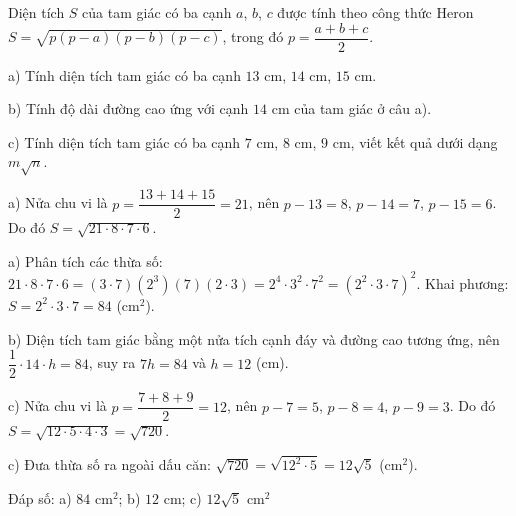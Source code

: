 \begin{problem}[9DS-CAN-042]
Diện tích $S$ của tam giác có ba cạnh $a$, $b$, $c$ được tính theo công thức Heron $S = \sqrt{p(p - a)(p - b)(p - c)}$, trong đó $p = \dfrac{a + b + c}{2}$.

a) Tính diện tích tam giác có ba cạnh $13$ cm, $14$ cm, $15$ cm.

b) Tính độ dài đường cao ứng với cạnh $14$ cm của tam giác ở câu a).

c) Tính diện tích tam giác có ba cạnh $7$ cm, $8$ cm, $9$ cm, viết kết quả dưới dạng $m\sqrt{n}$.

\begin{solution}
a) Nửa chu vi là $p = \dfrac{13 + 14 + 15}{2} = 21$, nên $p - 13 = 8$, $p - 14 = 7$, $p - 15 = 6$. Do đó $S = \sqrt{21 \cdot 8 \cdot 7 \cdot 6}$.

a) Phân tích các thừa số: $21 \cdot 8 \cdot 7 \cdot 6 = (3 \cdot 7)(2^3)(7)(2 \cdot 3) = 2^4 \cdot 3^2 \cdot 7^2 = (2^2 \cdot 3 \cdot 7)^2$. Khai phương: $S = 2^2 \cdot 3 \cdot 7 = 84$ (cm$^2$).

b) Diện tích tam giác bằng một nửa tích cạnh đáy và đường cao tương ứng, nên $\dfrac{1}{2} \cdot 14 \cdot h = 84$, suy ra $7h = 84$ và $h = 12$ (cm).

c) Nửa chu vi là $p = \dfrac{7 + 8 + 9}{2} = 12$, nên $p - 7 = 5$, $p - 8 = 4$, $p - 9 = 3$. Do đó $S = \sqrt{12 \cdot 5 \cdot 4 \cdot 3} = \sqrt{720}$.

c) Đưa thừa số ra ngoài dấu căn: $\sqrt{720} = \sqrt{12^2 \cdot 5} = 12\sqrt{5}$ (cm$^2$).

Đáp số: a) $\boxed{84 \text{ cm}^2}$; b) $\boxed{12 \text{ cm}}$; c) $\boxed{12\sqrt{5} \text{ cm}^2}$
\end{solution}
\end{problem}

